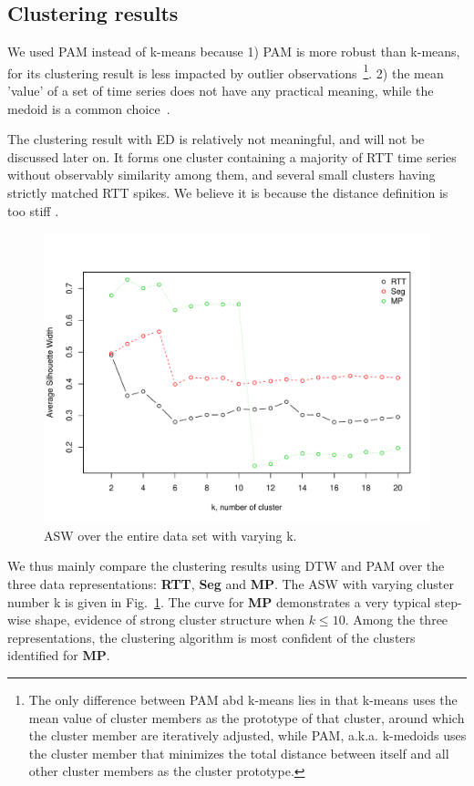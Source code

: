 \subsection{Clustering results}

We used \ac{PAM} instead of k-means because 1) \ac{PAM} is more robust than k-means, for its clustering result is less impacted by outlier observations~\footnote{The only difference between \ac{PAM} abd k-means lies in that k-means uses the mean value of cluster members as the prototype of that cluster, around which the cluster member are iteratively adjusted, while \ac{PAM}, a.k.a. k-medoids uses the cluster member that minimizes the total distance between itself and all other cluster members as the cluster prototype.}.
2) the mean 'value' of a set of time series does not have any practical meaning, while the medoid is a common choice~\cite{Aghabozorgi2015}. 

The clustering result with \ac{ED} is relatively not meaningful, and will not be discussed later on. It forms one cluster containing a majority of RTT time series without observably similarity among them, and several small clusters having strictly matched RTT spikes. We believe it is because the distance definition is too stiff .

\begin{figure}[!htb]
\centering
\includegraphics[width=.8\textwidth]{gfx/chap3/sil_comp.pdf}
\caption{\ac{ASW} over the entire data set with varying k.}
\label{fig:sil_comp}
\end{figure}
We thus mainly compare the clustering results using \ac{DTW} and \ac{PAM} over the three data representations: \textbf{RTT}, \textbf{Seg} and \textbf{MP}. The \ac{ASW} with varying cluster number k is given in Fig.~\ref{fig:sil_comp}. The curve for \textbf{MP} demonstrates a very typical step-wise shape, evidence of strong cluster structure when $k \leq 10$. Among the three representations, the clustering algorithm is most confident of the clusters identified for \textbf{MP}.

